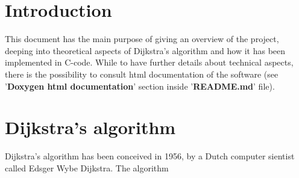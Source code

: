 \documentclass{article}                                                                                                     %
\begin{document}
\section{Introduction}                                                                                                      %
\label{sec:introduction}                                                                                                    %
  This document has the main purpose of giving an overview of the project, deeping into theoretical aspects of              %
  Dijkstra's algorithm and how it has been implemented in C-code. While to have further details about technical
  aspects, there is the possibility to consult html documentation of the software (see '\textbf{Doxygen html
  documentation}' section inside '\textbf{README.md}' file).

\section{Dijkstra's algorithm}                                                                                              %
\label{sec:dijkstra_algorithm}                                                                                              %
  Dijkstra's algorithm has been conceived in 1956, by a Dutch computer sientist called Edsger Wybe Dijkstra. The algorithm  %

\end{document}
